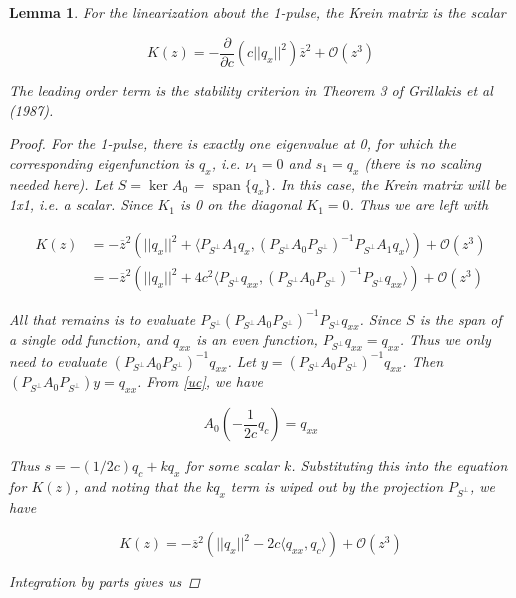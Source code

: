 \documentclass[12pt]{article}
\DeclareMathOperator{\spn}{span}
\newtheorem{lemma}{Lemma}
\begin{document}
\begin{lemma}\label{Krein1pulse}
For the linearization about the 1-pulse, the Krein matrix is the scalar

\begin{equation}
K(z) = -\frac{\partial}{\partial c} \left( c||q_x||^2 \right) \overline{z}^2 + \mathcal{O}(z^3)
\end{equation}

The leading order term is the stability criterion in Theorem 3 of Grillakis et al (1987).

\begin{proof}

For the 1-pulse, there is exactly one eigenvalue at 0, for which the corresponding eigenfunction is $q_x$, i.e. $\nu_1 = 0$ and $s_1 = q_x$ (there is no scaling needed here). Let $S = \ker A_0$ = $\spn \{q_x\}$. In this case, the Krein matrix will be 1x1, i.e. a scalar. Since $K_1$ is 0 on the diagonal $K_1 = 0$. Thus we are left with

\begin{align*}
K(z) &= -\overline{z}^2 \left( ||q_x||^2 + \langle P_{S^\perp} A_1 q_x, (P_{S^\perp} A_0 P_{S^\perp})^{-1} P_{S^\perp} A_1 q_x \rangle \right) + \mathcal{O}(z^3) \\
&= -\overline{z}^2 \left( ||q_x||^2 + 4 c^2 \langle P_{S^\perp} q_{xx}, (P_{S^\perp} A_0 P_{S^\perp})^{-1} P_{S^\perp} q_{xx} \rangle \right) + \mathcal{O}(z^3)
\end{align*}

All that remains is to evaluate $P_{S^\perp} (P_{S^\perp} A_0 P_{S^\perp})^{-1} P_{S^\perp} q_{xx}$. Since $S$ is the span of a single odd function, and $q_{xx}$ is an even function, $P_{S^\perp} q_{xx} = q_{xx}$. Thus we only need to evaluate $(P_{S^\perp} A_0 P_{S^\perp})^{-1} q_{xx}$. Let $y = (P_{S^\perp} A_0 P_{S^\perp})^{-1} q_{xx}$. Then $(P_{S^\perp} A_0 P_{S^\perp})y = q_{xx}$. From \eqref{uc}, we have

\begin{equation*}\label{uc}
A_0 \left( -\frac{1}{2c} q_c \right) = q_{xx}
\end{equation*}

Thus $s = -(1/2c) q_c + k q_x$ for some scalar $k$. Substituting this into the equation for $K(z)$, and noting that the $k q_x$ term is wiped out by the projection $P_{S^\perp}$, we have

\[
K(z) = -\overline{z}^2 \left( ||q_x||^2 - 2c \langle q_{xx}, q_c \rangle \right) + \mathcal{O}(z^3)
\]

Integration by parts gives us


\end{proof}
\end{lemma}
\end{document}
